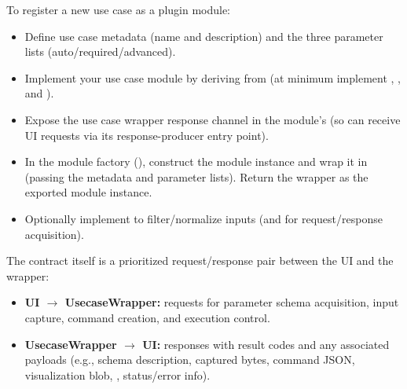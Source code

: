 To register a new use case as a plugin module:
\begin{itemize}
    \item Define use case metadata (name and description) and the three parameter lists (auto/required/advanced).
    \item Implement your use case module by deriving from  (at minimum implement , , and ).
    \item Expose the use case wrapper response channel in the module's  (so  can receive UI requests via its response-producer entry point).
    \item In the module factory (), construct the module instance and wrap it in  (passing the metadata and parameter lists). Return the wrapper as the exported module instance.
    \item Optionally implement  to filter/normalize  inputs (and  for request/response acquisition).
\end{itemize}

The contract itself is a prioritized request/response pair between the UI and the wrapper:
\begin{itemize}
    \item \textbf{UI $\rightarrow$ UsecaseWrapper:} requests for parameter schema acquisition,  input capture, command creation, and execution control.
    \item \textbf{UsecaseWrapper $\rightarrow$ UI:} responses with result codes and any associated payloads (e.g., schema description, captured  bytes, command JSON, visualization blob, , status/error info).
\end{itemize}

